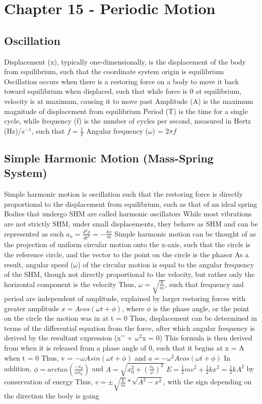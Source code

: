 \documentclass[11 pt, twoside]{article}
\newenvironment{outline*}
{
	\begin{outline}[enumerate]
	}
	{\end{outline}
}
\begin{document}
\section{Chapter 15 - Periodic Motion}
\subsection{Oscillation}
\begin{outline*}
\1 Displacement (x), typically one-dimensionally, is the displacement of the body from equilibrium, such that the coordinate system origin is equilibrium
\2 Oscillation occurs when there is a restoring force on a body to move it back toward equilibrium when displaced, such that while force is 0 at equilibrium, velocity is at maximum, causing it to move past
\1 Amplitude (A) is the maximum magnitude of displacement from equilibrium
\1 Period (T) is the time for a single cycle, while frequency (f) is the number of cycles per second, measured in Hertz (Hz)/$s^{-1}$, such that $f = \frac{1}{T}$
\1 Angular frequency ($\omega$) = $2\pi f$
\end{outline*}
\subsection{Simple Harmonic Motion (Mass-Spring System)}
\begin{outline*}
\1 Simple harmonic motion is oscillation such that the restoring force is directly proportional to the displacement from equilibrium, such as that of an ideal spring
\2 Bodies that undergo SHM are called harmonic oscillators
\2 While most vibrations are not strictly SHM, under small displacements, they behave as SHM and can be represented as such
\2 $a_x = \frac{d^2x}{dt^2} = -\frac{kx}{m}$
\1 Simple harmonic motion can be thought of as the projection of uniform circular motion onto the x-axis, such that the circle is the reference circle, and the vector to the point on the circle is the phasor
\2 As a result, angular speed ($\omega$) of the circular motion is equal to the angular frequency of the SHM, though not directly proportional to the velocity, but rather only the horizontal component is the velocity
\2 Thus, $\omega = \sqrt{\frac{k}{m}}$, such that frequency and period are independent of amplitude, explained by larger restoring forces with greater amplitude
\1 $x = Acos(\omega t + \phi)$, where $\phi$ is the phase angle, or the point on the circle the motion was in at t = 0
\2 Thus, displacement can be determined in terms of the differential equation from the force, after which angular frequency is derived by the resultant expression (x’’ + $\omega^2$x = 0)
\2 This formula is then derived from when it is released from a phase angle of 0, such that it begins at x = A when t = 0
\2 Thus, v = $-\omega Asin(\omega t + \phi)$ and $a = -\omega^2Acos(\omega t + \phi)$
\2 In addition, $\phi = arctan(\frac{-v_0}{\omega x_0})$ and $A = \sqrt{x_0^2 + (\frac{v_0}{\omega})^2}$
\1 $E = \frac{1}{2}mv^2 + \frac{1}{2}kx^2 = \frac{1}{2}kA^2$ by conservation of energy
\2 Thus, $v = \pm\sqrt{\frac{k}{m}}*\sqrt{A^2 - x^2}$, with the sign depending on the direction the body is going
\end{outline*}
\end{document}
